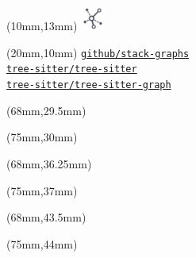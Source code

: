 \documentclass[aspectratio=169]{beamer}
\begin{document}
\begin{frame}
    \begin{textblock*}{10mm}(10mm,13mm)
        \includegraphics[width=8mm]{icons/graph.jpg}
    \end{textblock*}
    \begin{textblock*}{60mm}(20mm,10mm)
        \href{https://github.com/github/stack-graphs}{\texttt{github/stack-graphs}} \\
        \href{https://github.com/tree-sitter/tree-sitter}{\texttt{tree-sitter/tree-sitter}} \\
        \href{https://github.com/tree-sitter/tree-sitter-graph}{\texttt{tree-sitter/tree-sitter-graph}} \\
    \end{textblock*}

    \begin{textblock*}{10mm}(68mm,29.5mm)
    \end{textblock*}
    \begin{textblock*}{60mm}(75mm,30mm)
    \end{textblock*}

    \begin{textblock*}{10mm}(68mm,36.25mm)
    \end{textblock*}
    \begin{textblock*}{70mm}(75mm,37mm)
    \end{textblock*}

    \begin{textblock*}{10mm}(68mm,43.5mm)
    \end{textblock*}
    \begin{textblock*}{60mm}(75mm,44mm)
    \end{textblock*}


\end{frame}
\end{document}
